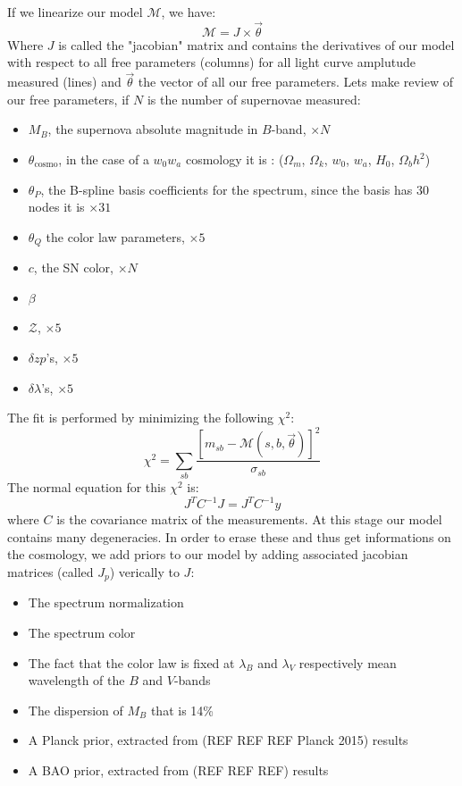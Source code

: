 \documentclass[\docopts]{\docclass}
\begin{document}
If we linearize our model $\mathcal{M}$, we have:
\begin{equation}
\mathcal{M} = J \times \vec\theta
\end{equation}
Where $J$ is called the "jacobian" matrix and contains the derivatives of our model with respect to all free parameters (columns) for all light curve amplutude measured (lines) and $\vec\theta$ the vector of all our free parameters.
Lets make review of our free parameters, if $N$ is the number of supernovae measured:
\begin{itemize}
\item $M_B$, the supernova absolute magnitude in $B$-band, $\times N$
\item $\theta_\text{cosmo}$, in the case of a $w_0w_a$ cosmology it is : ($\Omega_m$, $\Omega_k$, $w_0$, $w_a$, $H_0$, $\Omega_bh^2$)
\item $\theta_P$, the B-spline basis coefficients for the spectrum, since the basis has 30 nodes it is $\times 31$
\item $\theta_Q$ the color law parameters, $\times 5$
\item $c$, the SN color, $\times N$
\item $\beta$
\item $\mathcal{Z}$, $\times 5$
\item $\delta zp$'s, $\times 5$
\item $\delta \lambda$'s, $\times 5$
\end{itemize}
The fit is performed by minimizing the following $\chi^2$:
\begin{equation}
\chi^2 = \sum_{sb}\frac{[m_{sb} - \mathcal{M}(s, b, \vec\theta)]^2}{\sigma_{sb}}
\end{equation}
The normal equation for this $\chi^2$ is:
\begin{equation}
J^TC^{-1}J = J^TC^{-1}y
\end{equation}
where $C$ is the covariance matrix of the measurements.
At this stage our model contains many degeneracies.
In order to erase these and thus get informations on the cosmology, we add priors to our model by adding associated jacobian matrices (called $J_p$) verically to $J$:
\begin{itemize}
\item The spectrum normalization
\item The spectrum color
\item The fact that the color law is fixed at $\lambda_B$ and $\lambda_V$ respectively mean wavelength of the $B$ and $V$-bands
\item The dispersion of $M_B$ that is 14\%
\item A Planck prior, extracted from (REF REF REF Planck 2015) results
\item A BAO prior, extracted from (REF REF REF) results
\end{itemize}
\end{document}
